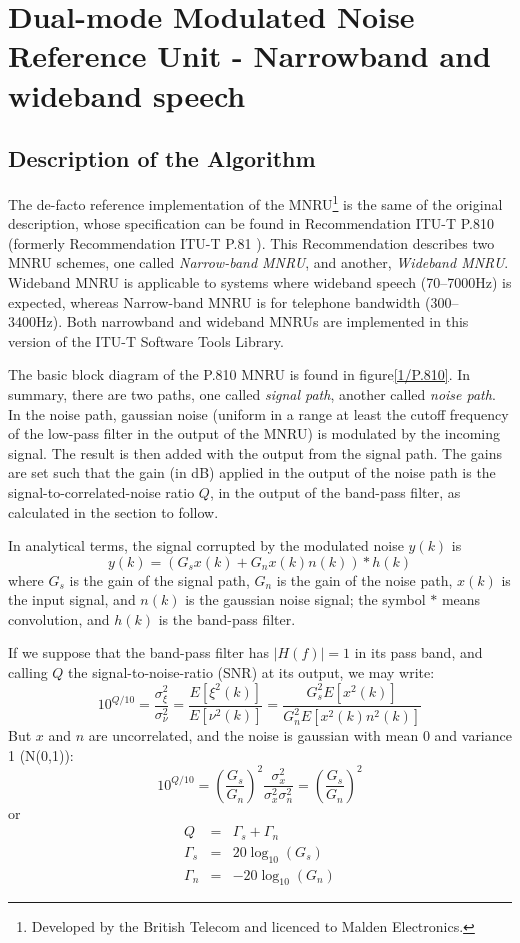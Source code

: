 \section{Dual-mode Modulated Noise Reference Unit - Narrowband and wideband speech}

\subsection{Description of the Algorithm}

The de-facto reference implementation of the MNRU\footnote{\SF Developed by the British Telecom and licenced to Malden
Electronics.} is the same of the original description, whose
specification can be found in Recommendation ITU-T P.810 \cite{P.810} (formerly Recommendation ITU-T P.81 \cite{Old-P.81}).
This Recommendation describes two MNRU schemes, one called {\em Narrow-band MNRU}, and another, {\em Wideband MNRU}.
Wideband MNRU is applicable to systems where wideband speech (70--7000Hz) is expected, whereas Narrow-band MNRU is for
telephone bandwidth (300--3400Hz).
Both narrowband and wideband MNRUs are implemented in this version of the ITU-T Software Tools Library.

The basic block diagram of the P.810 MNRU is found in figure\ref{1/P.810}.
In summary, there are two paths, one called {\em signal path}, another called {\em noise path}.
In the noise path, gaussian noise (uniform in a range at least the cutoff frequency of the low-pass filter in the
output of the MNRU) is modulated by the incoming signal.
The result is then added with the output from the signal path.
The gains are set such that the gain (in dB) applied in the output of the noise path is the signal-to-correlated-noise
ratio $Q$, in the output of the band-pass filter, as calculated in the section to follow.

In analytical terms, the signal corrupted by the modulated noise $y(k)$ is
\[
       y(k) = (G_s x(k) + G_n x(k) n(k)) \ast h(k)
\]
where $G_s$ is the gain of the signal path, $G_n$ is the gain of the noise path, $x(k)$ is the input signal, and $n(k)$
is the gaussian noise signal; the symbol $\ast$ means convolution, and $h(k)$ is the band-pass filter.

If we suppose that the band-pass filter has $|H(f)|=1$ in its pass band, and calling $Q$ the signal-to-noise-ratio (SNR)
at its output, we may write:
\[
    10^{Q/10} = \frac{\sigma^2_\xi}{\sigma^2_\nu} =
                \frac{E[\xi^2(k)]}{E[\nu^2(k)]}=
                \frac{G^2_s E[x^2(k)]}{G^2_n E[x^2(k) n^2(k)]}
\]
But $x$ and $n$ are uncorrelated, and the noise is gaussian with mean 0 and variance 1 (N(0,1)):
\[
    10^{Q/10} = \left( \frac{G_s}{G_n} \right)^2
                \frac{\sigma^2_x}{\sigma^2_x \sigma^2_n} =
                \left( \frac{G_s}{G_n} \right)^2
\]
or
\[
\begin{array}{lll}
     Q &= &\Gamma_s + \Gamma_n \\
     \Gamma_s &= &20 \log_{10}(G_s)\\
     \Gamma_n &= &-20 \log_{10}(G_n)
\end{array}
\]

